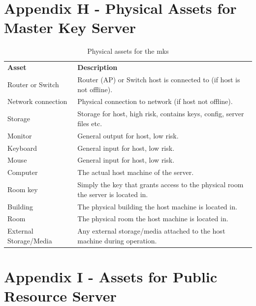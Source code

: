 \begin{appendices}


\section{Appendix H - Physical Assets for Master Key Server}
\label{appendix:mks_assets}

\begin{table}[htp]
  \begin{tabularx}{\linewidth}{lX}
    \textbf{Asset}          & \textbf{Description} \\
    Router or Switch        &	Router (AP) or Switch host is connected to (if host is not offline). \\
    Network connection      &	Physical connection to network (if host not offline). \\
    Storage                 &	Storage for host, high risk, contains keys, config, server files etc. \\
    Monitor                 &	General output for host, low risk. \\
    Keyboard                &	General input for host, low risk. \\
    Mouse                   &	General input for host, low risk. \\
    Computer                &	The actual host machine of the server. \\
    Room key                &	Simply the key that grants access to the physical room the server is located in. \\
    Building                &	The physical building the host machine is located in. \\
    Room                    &	The physical room the host machine is located in. \\
    External Storage/Media  &	Any external storage/media attached to the host machine during operation. \\
  \end{tabularx}
  \caption{Physical assets for the \acrfull{mks}}
  \label{tab:physical_assets_mk}
\end{table}

\section{Appendix I - Assets for Public Resource Server}
\label{appendix:prs_assets}


\end{appendices}
